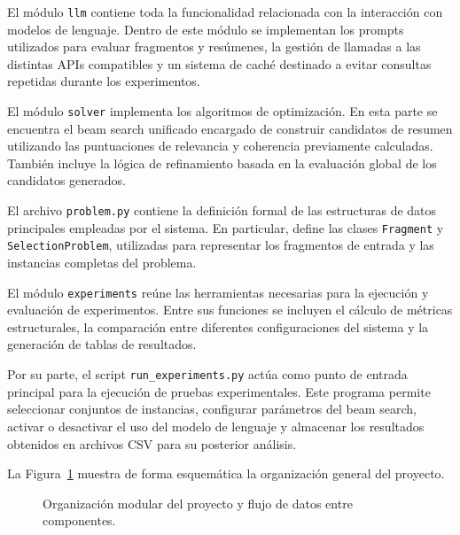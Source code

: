 \documentclass[12pt,a4paper]{article}
\begin{document}
El módulo \texttt{llm} contiene toda la funcionalidad relacionada con la interacción con modelos de lenguaje. Dentro de este módulo se implementan los prompts utilizados para evaluar fragmentos y resúmenes, la gestión de llamadas a las distintas APIs compatibles y un sistema de caché destinado a evitar consultas repetidas durante los experimentos.

El módulo \texttt{solver} implementa los algoritmos de optimización. En esta parte se encuentra el beam search unificado encargado de construir candidatos de resumen utilizando las puntuaciones de relevancia y coherencia previamente calculadas. También incluye la lógica de refinamiento basada en la evaluación global de los candidatos generados.

El archivo \texttt{problem.py} contiene la definición formal de las estructuras de datos principales empleadas por el sistema. En particular, define las clases \texttt{Fragment} y \texttt{SelectionProblem}, utilizadas para representar los fragmentos de entrada y las instancias completas del problema.

El módulo \texttt{experiments} reúne las herramientas necesarias para la ejecución y evaluación de experimentos. Entre sus funciones se incluyen el cálculo de métricas estructurales, la comparación entre diferentes configuraciones del sistema y la generación de tablas de resultados.

Por su parte, el script \texttt{run\_experiments.py} actúa como punto de entrada principal para la ejecución de pruebas experimentales. Este programa permite seleccionar conjuntos de instancias, configurar parámetros del beam search, activar o desactivar el uso del modelo de lenguaje y almacenar los resultados obtenidos en archivos CSV para su posterior análisis.

La Figura~\ref{fig:estructura} muestra de forma esquemática la organización general del proyecto.

\begin{figure}[H]
\centering
{}
\caption{Organización modular del proyecto y flujo de datos entre componentes.}
\label{fig:estructura}
\end{figure}
\end{document}
